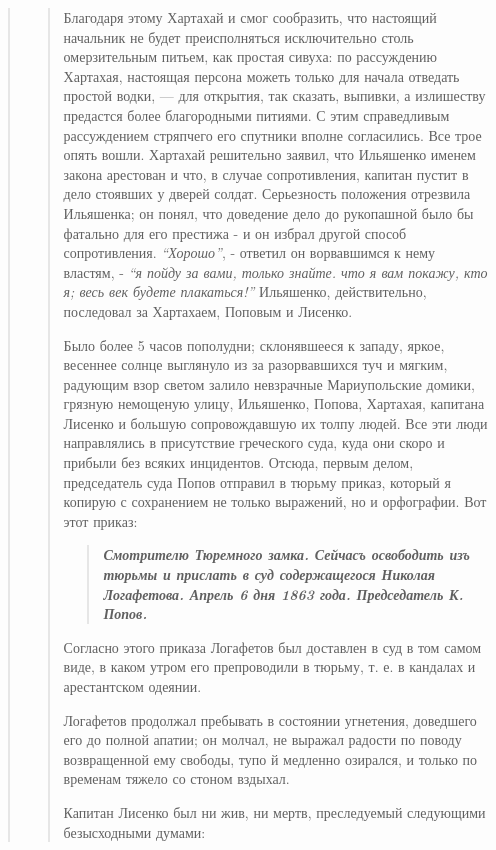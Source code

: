 \begin{quote}
\begin{quote}
Благодаря этому Хартахай и смог сообразить, что настоящий начальник не будет
преисполняться исключительно столь омерзительным питьем, как простая сивуха: по
рассуждению Хартахая, настоящая персона можеть только для начала отведать
простой водки, — для открытия, так сказать, выпивки, а излишеству предастся
более благородными питиями. С этим справедливым рассуждением стряпчего его
спутники вполне согласились. Все трое опять вошли. Хартахай решительно заявил,
что Ильяшенко именем закона арестован и что, в случае сопротивления, капитан
пустит в дело стоявших у дверей солдат.  Серьезность положения отрезвила
Ильяшенка; он понял, что доведение дело до рукопашной было бы фатально для его
престижа - и он избрал другой способ сопротивления. \emph{``Хорошо''}, -
ответил он ворвавшимся к нему властям, - \emph{``я пойду за вами, только
знайте. что я вам покажу, кто я; весь век будете плакаться!''} Ильяшенко,
действительно, последовал за Хартахаем, Поповым и Лисенко.

Было более 5 часов пополудни; склонявшееся к западу, яркое, 
весеннее солнце выглянуло из за разорвавшихся туч и мягким, радующим взор светом залило
невзрачные Мариупольские домики, грязную немощеную улицу,
Ильяшенко, Попова, Хартахая, капитана Лисенко и большую
сопровождавшую их толпу людей. Все эти люди направлялись в присутствие греческого суда, 
куда они скоро и прибыли без всяких инцидентов. Отсюда, первым делом, председатель суда Попов
отправил в тюрьму приказ, который я копирую с сохранением не только выражений, но и орфографии. Вот этот приказ:

\begin{quote}
\em\bfseries
Смотрителю Тюремного замка. Сейчасъ освободить изъ тюрьмы и 
прислать в суд содержащегося Николая Логафетова. Апрель
6 дня 1863 года. Председатель К. Попов.
\end{quote}

Согласно этого приказа Логафетов был доставлен в суд в том самом виде, в каком
утром его препроводили в тюрьму, т. е. в кандалах и арестантском одеянии.

Логафетов продолжал пребывать в состоянии угнетения, доведшего его до полной
апатии; он молчал, не выражал радости по поводу возвращенной ему свободы, тупо
й медленно озирался, и только по временам тяжело со стоном вздыхал.

Капитан Лисенко был ни жив, ни мертв, преследуемый следующими безысходными думами:

\begin{quote}
\em\bfseries
	

\end{quote}
\end{quote}
\end{quote}
